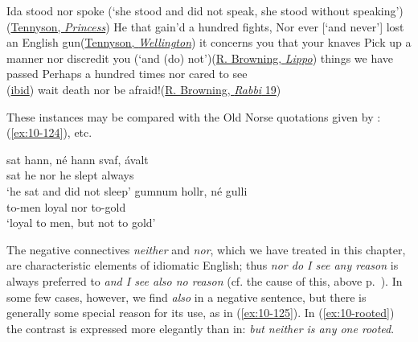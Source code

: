 \ea \label{ex:10-119}
\ea
Ida stood nor spoke \phantom{x} (`she stood and did not speak, she stood without speaking')\hfill(\href{https://en.m.wikisource.org/wiki/The_Princess;_a_medley/Canto_6}{Tennyson, \textit{Princess}})
\ex
He that gain'd a hundred fights, Nor ever [`and never'] lost an English gun\hfill(\href{https://en.wikisource.org/wiki/Maud,_and_other_poems/Ode_on_the_Death_of_the_Duke_of_Wellington}{Tennyson, \textit{Wellington}})
\ex
it concerns you that your knaves Pick up a manner nor discredit you \phantom{x} (`and (do) not')\hfill(\href{https://archive.org/details/cu31924013442631/page/124/mode/2up?q=%22concerns+you+that+your%22&view=theater}{R. Browning, \textit{Lippo}})
\ex
things we have passed Perhaps a hundred times nor cared to see\\\hfill(\href{https://archive.org/details/cu31924013442631/page/128/mode/2up?q=%22we+have+passed%22&view=theater}{ibid})
\ex
wait death nor be afraid!\hfill(\href{https://archive.org/details/cu31924013442631/page/638/mode/2up?q=%22wait+death%22&view=theater}{R. Browning, \textit{Rabbi} 19})
\z
\z

These instances may be compared with the Old Norse quotations given by \citet[\href{http://www.jstor.org/stable/40846532}{10}]{neckel1912germanischen}: (\ref{ex:10-124}), etc.

\ea \label{ex:10-124}
 \ea
 \gll sat hann, né hann svaf, ávalt\\
 sat he nor he slept always\\
 \glt `he sat and did not sleep'
 \ex
 \gll gumnum hollr, né gulli\\
 to-men loyal nor to-gold\\
 \glt `loyal to men, but not to gold'
 \z
\z

The negative connectives \textit{neither} and \textit{nor}, which we have treated in this chapter, are characteristic elements of idiomatic English; thus \textit{nor do I see any reason} is always preferred to \textit{and I see also no reason} (cf. the cause of this, above p.~\pageref{join-to-first}). In some few cases, however, we find \textit{also} in a negative sentence, but there is generally some special reason for its use, as in (\ref{ex:10-125}). %
In (\ref{ex:10-rooted}) the contrast is expressed more elegantly than in: \textit{but neither is any one rooted}.

